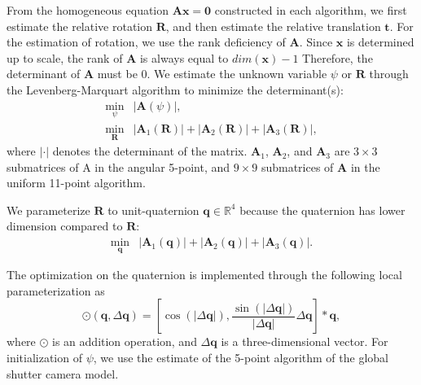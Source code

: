 \documentclass[10pt,twocolumn,letterpaper]{article}
\theoremstyle{definition}
\begin{document}
	
	From the homogeneous equation $\mathbf{A}\mathbf{x}=\mathbf{0}$ constructed in each algorithm, we first estimate the relative rotation $\mathbf{R}$, and then estimate the relative translation $\mathbf{t}$.
	For the estimation of rotation, we use the rank deficiency of $\mathbf{A}$.
	Since $\mathbf{x}$ is determined up to scale, the rank of $\mathbf{A}$ is always equal to $dim(\mathbf{x})-1$
	Therefore, the determinant of $\mathbf{A}$ must be 0.
	We estimate the unknown variable $ \psi $ or $ \mathbf{R} $ through the Levenberg-Marquart algorithm to minimize the determinant(s):
	\begin{equation}
	\begin{split}
	\min_{\psi}  & {
		\left| \mathbf{A}(\psi) \right|
	},
	\\
	\min_{\mathbf{R}}  & {
		\left| \mathbf{A}_{1}(\mathbf{R}) \right|  +  \left| \mathbf{A}_{2}(\mathbf{R}) \right| + \left| \mathbf{A}_{3}(\mathbf{R}) \right|
	},
	\end{split}
	\end{equation}
	where $|\cdot|$ denotes the determinant of the matrix.
	$\mathbf{A}_1$, $\mathbf{A}_2$, and $\mathbf{A}_3$ are $3 \times 3$ submatrices of A in the angular 5-point, and $9 \times 9$ submatrices of $\mathbf{A}$ in the uniform 11-point algorithm.
	
	We parameterize $\mathbf{R}$ to unit-quaternion $\mathbf{q} \in \mathbb{R}^{4}$ because the quaternion has lower dimension compared to $\mathbf{R}$:
	\begin{equation}
	\begin{split}
	\min_{\mathbf{q}}  & {
		\left| \mathbf{A}_{1}(\mathbf{q}) \right|  +  \left| \mathbf{A}_{2}(\mathbf{q}) \right| + \left| \mathbf{A}_{3}(\mathbf{q}) \right| .
	}
	\end{split}
	\end{equation}
	
	The optimization on the quaternion is implemented through  the following local parameterization as 
	\begin{equation}
	\odot(\mathbf{q}, \Delta \mathbf{q}) = \left[ \cos(|\Delta \mathbf{q}|), \frac{ \sin(|\Delta \mathbf{q}|)}{|\Delta \mathbf{q}|} \Delta \mathbf{q} \right] \ast  \mathbf{q}  ,
	\end{equation}
	where $ \odot $ is an addition operation, and $\Delta \mathbf{q}$ is a three-dimensional vector.
	For initialization of $\psi$, we use the estimate of the 5-point algorithm of the global shutter camera model.
	
\end{document}
